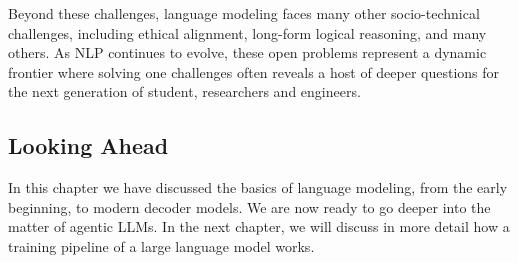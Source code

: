 Beyond these challenges, language modeling faces many other socio-technical challenges, including ethical alignment, long-form logical reasoning, and many others. As NLP continues to evolve, these open problems represent a dynamic frontier where solving one challenges often reveals a host of deeper questions for the next generation of student, researchers and engineers.

\subsection{Looking Ahead}
In this chapter we have discussed the basics of language modeling, from the early beginning, to modern decoder models. We are now ready to go deeper into the matter of agentic LLMs. In the next chapter, we will discuss in more detail how a training pipeline of a large language model works.










